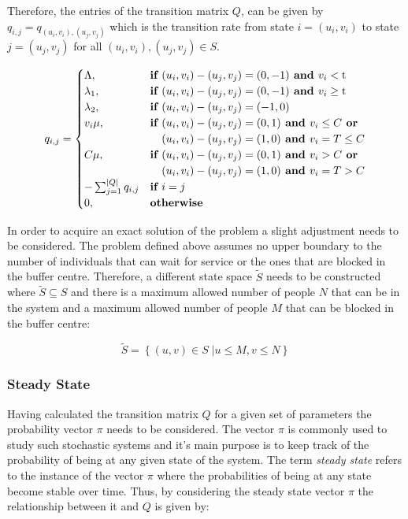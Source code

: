 Therefore, the entries of the transition matrix \(Q\), can be given by 
\( q_{i,j} = q_{(u_i, v_i),(u_j, v_j)} \) which is the transition rate from state 
\( i = (u_i, v_i) \) to state \( j = (u_j , v_j) \) for all 
\( (u_i, v_i), (u_j, v_j) \in S \).

\begin{equation} \label{eq:markov_transition_rate}
    q_{i, j} = 
    \begin{cases}
        \Lambda, & \textbf{if } (u_i, v_i) - (u_j, v_j) = (0,-1) \textbf{ and } 
        v_i < \text{t} \\
        \lambda_1, & \textbf{if } (u_i, v_i) - (u_j, v_j) = (0,-1) \textbf{ and } 
        v_i \geq \text{t} \\
        \lambda_2, & \textbf{if } (u_i, v_i) - (u_j, v_j) = (-1,0) \\
        v_i \mu, & \textbf{if } (u_i, v_i) - (u_j, v_j) = (0,1) \textbf{ and } 
        v_i \leq C \textbf{ or} \\ & \hspace{0.37cm}(u_i, v_i) - (u_j, v_j) = (1,0) 
        \textbf{ and } v_i = T \leq C \\
        C \mu, & \textbf{if } (u_i, v_i) - (u_j, v_j) = (0,1) \textbf{ and } v_i > C 
        \textbf{ or} \\ & \hspace{0.37cm}(u_i, v_i) - (u_j, v_j) = (1,0) \textbf{ and } 
        v_i = T > C\\
        -\sum_{j=1}^{|Q|}{q_{i,j}} & \textbf{if } i = j \\
        0, & \textbf{otherwise}
    \end{cases}
\end{equation}

In order to acquire an exact solution of the problem a slight adjustment needs to 
be considered. 
The problem defined above assumes no upper boundary to the number of individuals 
that can wait for service or the ones that are blocked in the buffer centre. 
Therefore, a different state space \( \tilde S \) needs to be constructed where 
\( \tilde S \subseteq S \) and there is a maximum allowed number of people \( N \) 
that can be in the system and a maximum allowed number of people \( M \) that can
be blocked in the buffer centre:

\begin{equation}
    \tilde S = \left\{ (u, v) \in S\;| u \leq M, v\leq N \right\}
\end{equation}


\subsubsection{Steady State}
Having calculated the transition matrix \( Q \) for a given set of parameters the 
probability vector \( \pi \) needs to be considered. 
The vector \( \pi \) is commonly used to study such stochastic systems and it's 
main purpose is to keep track of the probability of being at any given state of 
the system. 
The term \textit{steady state} refers to the instance of the vector \( \pi \) where 
the probabilities of being at any state become stable over time. 
Thus, by considering the steady state vector \( \pi \) the relationship between 
it and \(Q \) is given by:

